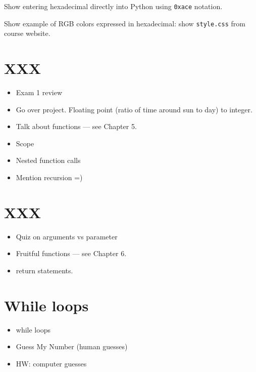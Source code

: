 \documentclass{article}
\begin{document}
Show entering hexadecimal directly into Python using \verb|0xace|
notation.

Show example of RGB colors expressed in hexadecimal: show
\verb|style.css| from course website.

\newpage

\section*{XXX}

\begin{itemize}
\item Exam 1 review
\item Go over project.  Floating point (ratio of time around sun to
  day) to integer.
\item Talk about functions --- see Chapter 5.
\item Scope
\item Nested function calls
\item Mention recursion =)
\end{itemize}

\section*{XXX}
\begin{itemize}
\item Quiz on arguments vs parameter
\item Fruitful functions --- see Chapter 6.
\item return statements.
\end{itemize}

\section*{While loops}
\begin{itemize}
\item while loops
\item Guess My Number (human guesses)
\item HW: computer guesses
\end{itemize}
\end{document}
